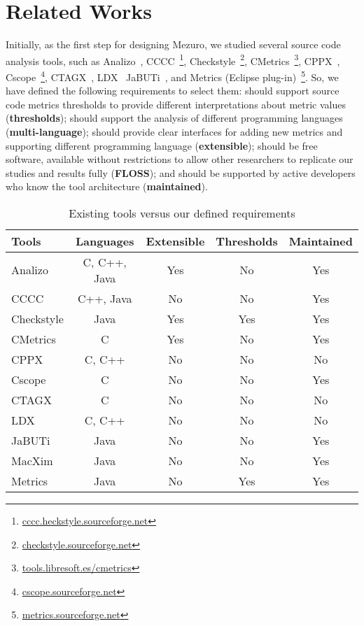 \section{Related Works}
\label{sec:related_works}

Initially, as the first step for designing Mezuro, we studied several source
code analysis tools, such as
%
Analizo~\cite{analizo}, CCCC~\footnote{\url{cccc.heckstyle.sourceforge.net}},
Checkstyle~\footnote{\url{checkstyle.sourceforge.net}},
CMetrics~\footnote{\url{tools.libresoft.es/cmetrics}}, CPPX~\cite{hassan2005},
Cscope~\footnote{\url{cscope.sourceforge.net}}, CTAGX~\cite{hassan2005},
LDX~\cite{hassan2005} JaBUTi~\cite{jabuti}, and Metrics (Eclipse
plug-in)~\footnote{\url{metrics.sourceforge.net}}.
%
So, we have defined the following requirements to select them: should
support source code metrics thresholds to provide different interpretations
about metric values (\textbf{thresholds}); should support the analysis of different programming
languages (\textbf{multi-language}); should provide clear interfaces for adding new metrics and
supporting different programming language (\textbf{extensible}); should be free software,
available without restrictions to allow other researchers to replicate our
studies and results fully (\textbf{FLOSS}); and should be supported by active developers who
know the tool architecture (\textbf{maintained}).

\vspace{-0.5cm}

\begin{table}[htb]
  \centering
{}
  \begin{tabular}{|l|c|c|c|c|}
    \hline
    \textbf{Tools} &
    \textbf{Languages} & %
    \textbf{Extensible} & %
    \textbf{Thresholds} & %
    \textbf{Maintained} \\\hline\hline %

    Analizo 	& C, C++, Java & Yes & No  & Yes    \\\hline
    CCCC 	& C++, Java    & No  & No  & Yes    \\\hline
    Checkstyle	& Java         & Yes  & Yes & Yes    \\\hline
    CMetrics	& C            & Yes & No  & Yes    \\\hline
    CPPX	& C, C++       & No  & No  & No     \\\hline
    Cscope	& C            & No  & No  & Yes    \\\hline
    CTAGX	& C            & No  & No  & No     \\\hline
    LDX		& C, C++       & No  & No  & No     \\\hline
    JaBUTi	& Java         & No  & No  & Yes    \\\hline
    MacXim	& Java         & No  & No  & Yes    \\\hline
    Metrics 	& Java         & No  & Yes & Yes    \\\hline

  \end{tabular}
  \caption{Existing tools versus our defined requirements}
  \label{tab:tools}
\end{table}

